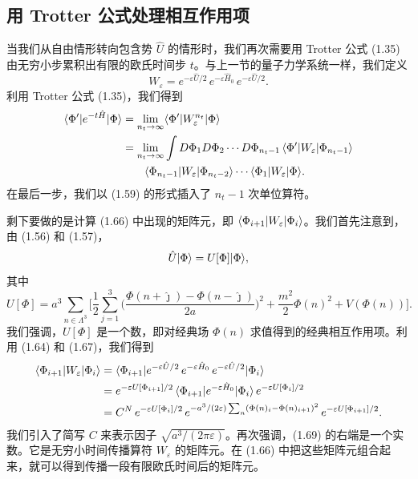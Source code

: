 \subsection{用 Trotter 公式处理相互作用项}

当我们从自由情形转向包含势 $\hat{U}$ 的情形时，我们再次需要用 Trotter 公式 (1.35) 由无穷小步累积出有限的欧氏时间步 $t$。与上一节的量子力学系统一样，我们定义
\begin{equation}
  W_\varepsilon = e^{-\varepsilon\hat{U}/2}\,e^{-\varepsilon\hat{H}_0}\,
  e^{-\varepsilon\hat{U}/2}.
\end{equation}
利用 Trotter 公式 (1.35)，我们得到
\begin{align}
  \langle\Phi'|e^{-t\hat{H}}|\Phi\rangle
  &= \lim_{n_t\to\infty}\langle\Phi'|W_\varepsilon^{n_t}|\Phi\rangle \notag\\
  &= \lim_{n_t\to\infty}\int D\Phi_1 D\Phi_2\cdots D\Phi_{n_t-1}\,
     \langle\Phi'|W_\varepsilon|\Phi_{n_t-1}\rangle \notag\\
  &\qquad \langle\Phi_{n_t-1}|W_\varepsilon|\Phi_{n_t-2}\rangle\cdots
     \langle\Phi_1|W_\varepsilon|\Phi\rangle.
\end{align}
在最后一步，我们以 (1.59) 的形式插入了 $n_t - 1$ 次单位算符。

剩下要做的是计算 (1.66) 中出现的矩阵元，即 $\langle\Phi_{i+1}|W_\varepsilon|\Phi_i\rangle$。我们首先注意到，由 (1.56) 和 (1.57)，
\begin{equation}
  \hat{U}|\Phi\rangle = U[\Phi]|\Phi\rangle,
\end{equation}
其中
\begin{equation}
  U[\Phi] = a^3\sum_{n\in\Lambda^3}\Big[
    \frac{1}{2}\sum_{j=1}^3
      \Big(\frac{\Phi(n+\hat{\jmath}) - \Phi(n-\hat{\jmath})}{2a}\Big)^2
    + \frac{m^2}{2}\Phi(n)^2 + V(\Phi(n))\Big].
\end{equation}
我们强调，$U[\Phi]$ 是一个数，即对经典场 $\Phi(n)$ 求值得到的经典相互作用项。利用 (1.64) 和 (1.67)，我们得到
\begin{align}
  \langle\Phi_{i+1}|W_\varepsilon|\Phi_i\rangle
  &= \langle\Phi_{i+1}|e^{-\varepsilon\hat{U}/2}\,e^{-\varepsilon\hat{H}_0}\,
     e^{-\varepsilon\hat{U}/2}|\Phi_i\rangle \notag\\
  &= e^{-\varepsilon U[\Phi_{i+1}]/2}\,
     \langle\Phi_{i+1}|e^{-\varepsilon\hat{H}_0}|\Phi_i\rangle\,
     e^{-\varepsilon U[\Phi_i]/2} \notag\\
  &= C^N\,e^{-\varepsilon U[\Phi_i]/2}\,
     e^{-a^3/(2\varepsilon)\sum_n(\Phi(n)_i - \Phi(n)_{i+1})^2}\,
     e^{-\varepsilon U[\Phi_{i+1}]/2}.
\end{align}
我们引入了简写 $C$ 来表示因子 $\sqrt{a^3/(2\pi \varepsilon)}$。再次强调，(1.69) 的右端是一个实数。它是无穷小时间传播算符 $W_\varepsilon$ 的矩阵元。在 (1.66) 中把这些矩阵元组合起来，就可以得到传播一段有限欧氏时间后的矩阵元。


